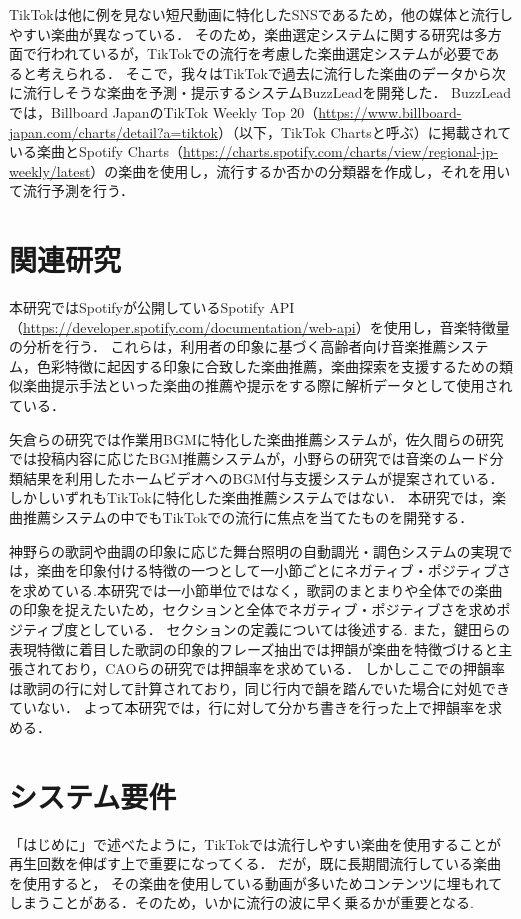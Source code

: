 \documentclass[titlepage]{jsreport}
\begin{document}
TikTokは他に例を見ない短尺動画に特化したSNSであるため，他の媒体と流行しやすい楽曲が異なっている．
そのため，楽曲選定システムに関する研究は多方面で行われているが，TikTokでの流行を考慮した楽曲選定システムが必要であると考えられる．
そこで，我々はTikTokで過去に流行した楽曲のデータから次に流行しそうな楽曲を予測・提示するシステムBuzzLeadを開発した．
BuzzLeadでは，Billboard JapanのTikTok Weekly Top 20（\url{https://www.billboard-japan.com/charts/detail?a=tiktok}）（以下，TikTok Chartsと呼ぶ）に掲載されている楽曲とSpotify Charts（\url{https://charts.spotify.com/charts/view/regional-jp-weekly/latest}）の楽曲を使用し，流行するか否かの分類器を作成し，それを用いて流行予測を行う．


\chapter{関連研究}
本研究ではSpotifyが公開しているSpotify API（\url{https://developer.spotify.com/documentation/web-api}）を使用し，音楽特徴量の分析を行う．
これらは，利用者の印象に基づく高齢者向け音楽推薦システム\cite{paper4}，色彩特徴に起因する印象に合致した楽曲推薦\cite{paper5}，楽曲探索を支援するための類似楽曲提示手法\cite{paper9}といった楽曲の推薦や提示をする際に解析データとして使用されている．

矢倉らの研究では作業用BGMに特化した楽曲推薦システム\cite{paper1}が，佐久間らの研究では投稿内容に応じたBGM推薦システム\cite{paper2}が，小野らの研究では音楽のムード分類結果を利用したホームビデオへのBGM付与支援システム\cite{paper10}が提案されている．
しかしいずれもTikTokに特化した楽曲推薦システムではない． 本研究では，楽曲推薦システムの中でもTikTokでの流行に焦点を当てたものを開発する． 

神野らの歌詞や曲調の印象に応じた舞台照明の自動調光・調色システムの実現\cite{paper6}では，楽曲を印象付ける特徴の一つとして一小節ごとにネガティブ・ポジティブさを求めている.本研究では一小節単位ではなく，歌詞のまとまりや全体での楽曲の印象を捉えたいため，セクションと全体でネガティブ・ポジティブさを求めポジティブ度としている．
セクションの定義については後述する.
また，鍵田らの表現特徴に着目した歌詞の印象的フレーズ抽出\cite{paper3}では押韻が楽曲を特徴づけると主張されており，CAOらの研究では押韻率\cite{paper7}を求めている．
しかしここでの押韻率は歌詞の行に対して計算されており，同じ行内で韻を踏んでいた場合に対処できていない．
よって本研究では，行に対して分かち書きを行った上で押韻率を求める．



\chapter{システム要件}
「はじめに」で述べたように，TikTokでは流行しやすい楽曲を使用することが再生回数を伸ばす上で重要になってくる．
だが，既に長期間流行している楽曲を使用すると， その楽曲を使用している動画が多いためコンテンツに埋もれてしまうことがある．そのため，いかに流行の波に早く乗るかが重要となる.
\end{document}
